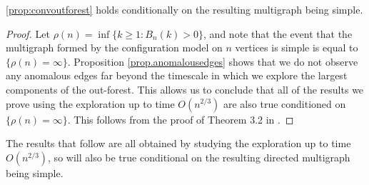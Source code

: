 


\begin{proposition}
 \cref{prop:convoutforest} holds conditionally on the resulting multigraph being simple. 
\end{proposition}
\begin{proof}
Let $\rho(n)=\inf\{k\geq 1:B_n(k)>0\}$, and note that the event that the multigraph formed by the configuration model on $n$ vertices is simple is equal to $\{\rho(n)=\infty\}$. Proposition \ref{prop.anomalousedges} shows that we do not observe any anomalous edges far beyond the timescale in which we explore the largest components of the out-forest. This allows us to conclude that all of the results we prove using the exploration up to time $O(n^{2/3})$ are also true conditioned on $\{\rho(n)=\infty\}$. This follows from the proof of Theorem 3.2 in \cite{josephComponentSizesCritical2014}.
\end{proof}
The results that follow are all obtained by studying the exploration up to time $O(n^{2/3})$, so will also be true conditional on the resulting directed multigraph being simple.


